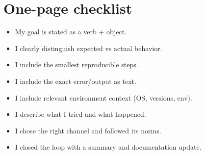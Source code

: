 \section{One-page checklist}
\begin{itemize}[noitemsep]
  \item My goal is stated as a verb + object.
  \item I clearly distinguish expected vs actual behavior.
  \item I include the smallest reproducible steps.
  \item I include the exact error/output as text.
  \item I include relevant environment context (OS, versions, env).
  \item I describe what I tried and what happened.
  \item I chose the right channel and followed its norms.
  \item I closed the loop with a summary and documentation update.
\end{itemize}
